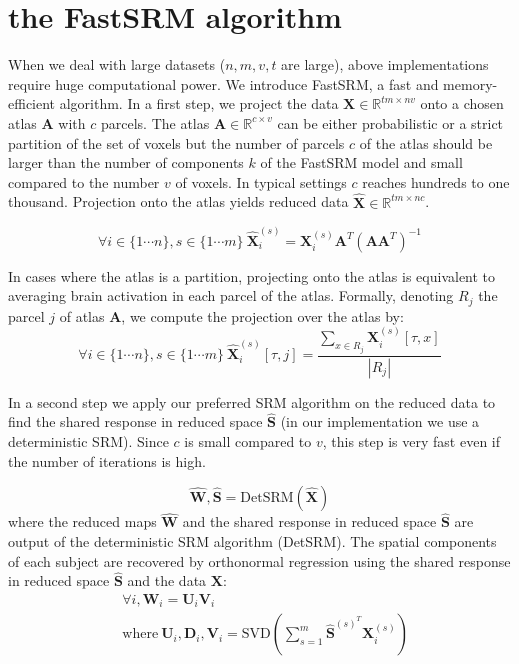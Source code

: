 \documentclass{report}
\begin{document}

\section{the FastSRM algorithm}
When we deal with large datasets ($n, m, v, t$ are large), above implementations require huge computational power. We introduce FastSRM, a fast and memory-efficient algorithm.
%
In a first step, we project the data $\mathbf{X} \in \mathbb{R}^{tm \times nv}$ onto a chosen atlas $\mathbf{A}$ with $c$ parcels.
%
The atlas $\mathbf{A} \in \mathbb{R}^{c \times v}$ can be either probabilistic or a strict partition of the set of voxels but the number of parcels $c$ of the atlas should be larger than the number of components $k$ of the FastSRM model and small compared to the number $v$ of voxels.
%
In typical settings $c$ reaches hundreds to one thousand.
%
Projection onto the atlas yields reduced data $\hat{\mathbf{X}} \in \mathbb{R}^{tm \times nc}$.

\[
\forall i \in \{1 \cdots n\}, s \in \{1 \cdots m \} \ \hat{\mathbf{X}}^{(s)}_i = \mathbf{X}^{(s)}_i \mathbf{A}^T (\mathbf{A} \mathbf{A}^T)^{-1}
\]

In cases where the atlas is a partition, projecting onto the atlas is equivalent to averaging brain activation in each parcel of the atlas. 
%
Formally, denoting $R_j$ the parcel $j$ of atlas $\mathbf{A}$, we compute the projection over the atlas by: 
\[
\forall i \in \{1 \cdots n\}, s \in \{1 \cdots m \} \ \hat{\mathbf{X}}^{(s)}_i[\tau, j] = \frac{\sum_{x \in R_j} \mathbf{X}^{(s)}_i[\tau, x]}{|R_j|}
\]

In a second step we apply our preferred SRM algorithm on the reduced data to find the shared response in reduced space $\hat{\mathbf{S}}$ (in our implementation we use a deterministic SRM). Since $c$ is small compared to $v$, this step is very fast even if the number of iterations is high.
 
\[
	\hat{\mathbf{W}}, \hat{\mathbf{S}} =\text{DetSRM}(\hat{\mathbf{X}})
\]
where the reduced maps $\hat{\mathbf{W}}$ and the shared response in reduced space $\hat{\mathbf{S}}$ are output of the deterministic SRM algorithm (DetSRM).
%
The spatial components of each subject are recovered by orthonormal regression using the shared response in reduced space $\hat{\mathbf{S}}$ and the data $\mathbf{X}$:
\begin{align*}
&\forall i, \mathbf{W}_i= \mathbf{U}_i \mathbf{V}_i  \\
& \text{where} \ \mathbf{U}_i, \mathbf{D}_i, \mathbf{V}_i = \text{SVD} \left(\sum_{s=1}^m \hat{\mathbf{S}}^{(s)^T} \mathbf{X}^{(s)}_i \right)
\end{align*}
\end{document}
